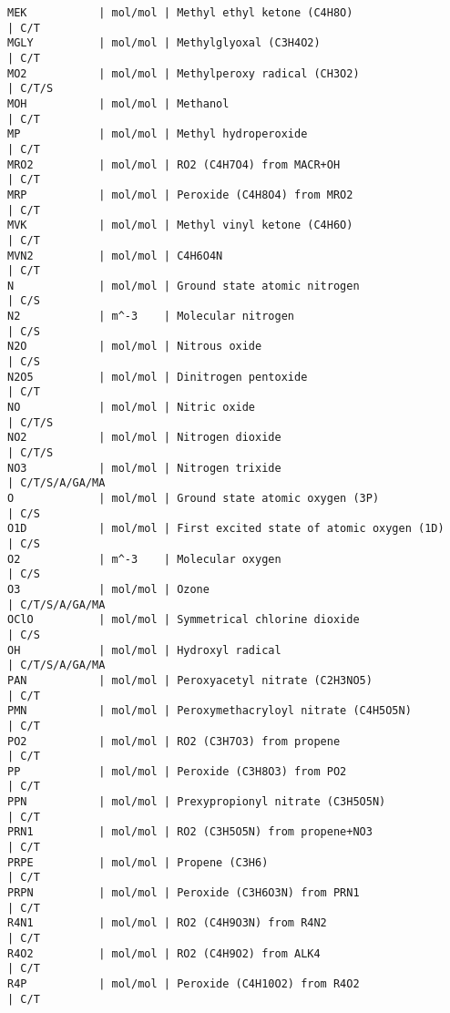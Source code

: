 {\begin{verbatim}
MEK           | mol/mol | Methyl ethyl ketone (C4H8O)                     | C/T
MGLY          | mol/mol | Methylglyoxal (C3H4O2)                          | C/T
MO2           | mol/mol | Methylperoxy radical (CH3O2)                    | C/T/S
MOH           | mol/mol | Methanol                                        | C/T
MP            | mol/mol | Methyl hydroperoxide                            | C/T
MRO2          | mol/mol | RO2 (C4H7O4) from MACR+OH                       | C/T
MRP           | mol/mol | Peroxide (C4H8O4) from MRO2                     | C/T
MVK           | mol/mol | Methyl vinyl ketone (C4H6O)                     | C/T
MVN2          | mol/mol | C4H6O4N                                         | C/T
N             | mol/mol | Ground state atomic nitrogen                    | C/S
N2            | m^-3    | Molecular nitrogen                              | C/S
N2O           | mol/mol | Nitrous oxide                                   | C/S
N2O5          | mol/mol | Dinitrogen pentoxide                            | C/T
NO            | mol/mol | Nitric oxide                                    | C/T/S
NO2           | mol/mol | Nitrogen dioxide                                | C/T/S
NO3           | mol/mol | Nitrogen trixide                                | C/T/S/A/GA/MA
O             | mol/mol | Ground state atomic oxygen (3P)                 | C/S
O1D           | mol/mol | First excited state of atomic oxygen (1D)       | C/S
O2            | m^-3    | Molecular oxygen                                | C/S
O3            | mol/mol | Ozone                                           | C/T/S/A/GA/MA
OClO          | mol/mol | Symmetrical chlorine dioxide                    | C/S
OH            | mol/mol | Hydroxyl radical                                | C/T/S/A/GA/MA
PAN           | mol/mol | Peroxyacetyl nitrate (C2H3NO5)                  | C/T
PMN           | mol/mol | Peroxymethacryloyl nitrate (C4H5O5N)            | C/T
PO2           | mol/mol | RO2 (C3H7O3) from propene                       | C/T
PP            | mol/mol | Peroxide (C3H8O3) from PO2                      | C/T
PPN           | mol/mol | Prexypropionyl nitrate (C3H5O5N)                | C/T
PRN1          | mol/mol | RO2 (C3H5O5N) from propene+NO3                  | C/T
PRPE          | mol/mol | Propene (C3H6)                                  | C/T
PRPN          | mol/mol | Peroxide (C3H6O3N) from PRN1                    | C/T
R4N1          | mol/mol | RO2 (C4H9O3N) from R4N2                         | C/T
R4O2          | mol/mol | RO2 (C4H9O2) from ALK4                          | C/T
R4P           | mol/mol | Peroxide (C4H10O2) from R4O2                    | C/T

\end{verbatim}}
